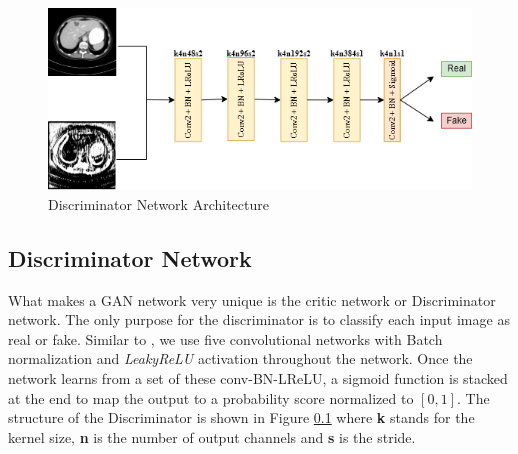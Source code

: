 \documentclass[journal]{IEEEtran}
\begin{document}
\begin{figure}[th!]
    \centering
    \includegraphics[width=12cm]{discriminator}
    \caption{Discriminator Network Architecture}
    \label{discriminator}
\end{figure}

\subsection{Discriminator Network}
\label{discriminator}
	What makes a GAN network very unique is the critic network or Discriminator network.  The only purpose for the discriminator is to classify each input image as real or fake.  Similar to \cite{alsaiari2019image}, we use five convolutional networks with Batch normalization and \emph{LeakyReLU} activation throughout the network.  Once the network learns from a set of these conv-BN-LReLU, a sigmoid function is stacked at the end to map the output to a probability score normalized to $[0,1]$.  The structure of the Discriminator is shown in Figure \ref{discriminator} where \textbf{k} stands for the kernel size, \textbf{n} is the number of output channels and \textbf{s} is the stride.

\end{document}
